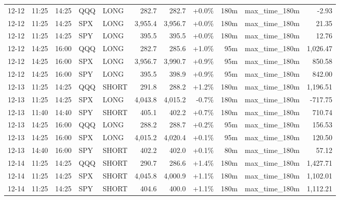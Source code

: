 \documentclass[11pt,a4paper,twoside]{article}
\begin{document}
\begin{center}
\begin{longtable}{>{\color{txtmain}}l l l l l r r r r >{\color{txtmain}}l r}
12-12 & 11:25 & 14:25 & QQQ & LONG & 282.7 & 282.7 & \textcolor{wingreen}{+0.0\%} & 180m & max\_time\_180m & \textcolor{lossred}{-2.93} \\
12-12 & 11:25 & 14:25 & SPX & LONG & 3,955.4 & 3,956.7 & \textcolor{wingreen}{+0.0\%} & 180m & max\_time\_180m & \textcolor{wingreen}{21.35} \\
12-12 & 11:25 & 14:25 & SPY & LONG & 395.5 & 395.5 & \textcolor{wingreen}{+0.0\%} & 180m & max\_time\_180m & \textcolor{wingreen}{12.76} \\
12-12 & 14:25 & 16:00 & QQQ & LONG & 282.7 & 285.6 & \textcolor{wingreen}{+1.0\%} & 95m & max\_time\_180m & \textcolor{wingreen}{1,026.47} \\
12-12 & 14:25 & 16:00 & SPX & LONG & 3,956.7 & 3,990.7 & \textcolor{wingreen}{+0.9\%} & 95m & max\_time\_180m & \textcolor{wingreen}{850.58} \\
12-12 & 14:25 & 16:00 & SPY & LONG & 395.5 & 398.9 & \textcolor{wingreen}{+0.9\%} & 95m & max\_time\_180m & \textcolor{wingreen}{842.00} \\
12-13 & 11:25 & 14:25 & QQQ & SHORT & 291.8 & 288.2 & \textcolor{wingreen}{+1.2\%} & 180m & max\_time\_180m & \textcolor{wingreen}{1,196.51} \\
12-13 & 11:25 & 14:25 & SPX & LONG & 4,043.8 & 4,015.2 & \textcolor{lossred}{-0.7\%} & 180m & max\_time\_180m & \textcolor{lossred}{-717.75} \\
12-13 & 11:40 & 14:40 & SPY & SHORT & 405.1 & 402.2 & \textcolor{wingreen}{+0.7\%} & 180m & max\_time\_180m & \textcolor{wingreen}{710.74} \\
12-13 & 14:25 & 16:00 & QQQ & LONG & 288.2 & 288.7 & \textcolor{wingreen}{+0.2\%} & 95m & max\_time\_180m & \textcolor{wingreen}{156.53} \\
12-13 & 14:25 & 16:00 & SPX & LONG & 4,015.2 & 4,020.4 & \textcolor{wingreen}{+0.1\%} & 95m & max\_time\_180m & \textcolor{wingreen}{120.50} \\
12-13 & 14:40 & 16:00 & SPY & SHORT & 402.2 & 402.0 & \textcolor{wingreen}{+0.1\%} & 80m & max\_time\_180m & \textcolor{wingreen}{57.12} \\
12-14 & 11:25 & 14:25 & QQQ & SHORT & 290.7 & 286.6 & \textcolor{wingreen}{+1.4\%} & 180m & max\_time\_180m & \textcolor{wingreen}{1,427.71} \\
12-14 & 11:25 & 14:25 & SPX & SHORT & 4,045.8 & 4,000.9 & \textcolor{wingreen}{+1.1\%} & 180m & max\_time\_180m & \textcolor{wingreen}{1,102.01} \\
12-14 & 11:25 & 14:25 & SPY & SHORT & 404.6 & 400.0 & \textcolor{wingreen}{+1.1\%} & 180m & max\_time\_180m & \textcolor{wingreen}{1,112.21} \\

\end{longtable}
\end{center}
\end{document}
